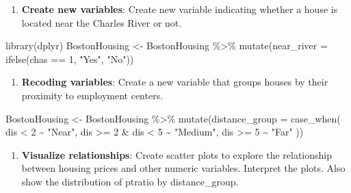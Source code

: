 \documentclass[
]{book}
\newenvironment{Shaded}{\begin{snugshade}}{\end{snugshade}}
\newcommand{\AttributeTok}[1]{\textcolor[rgb]{0.77,0.63,0.00}{#1}}
\newcommand{\DecValTok}[1]{\textcolor[rgb]{0.00,0.00,0.81}{#1}}
\newcommand{\FunctionTok}[1]{\textcolor[rgb]{0.00,0.00,0.00}{#1}}
\newcommand{\NormalTok}[1]{#1}
\newcommand{\OtherTok}[1]{\textcolor[rgb]{0.56,0.35,0.01}{#1}}
\newcommand{\SpecialCharTok}[1]{\textcolor[rgb]{0.00,0.00,0.00}{#1}}
\newcommand{\StringTok}[1]{\textcolor[rgb]{0.31,0.60,0.02}{#1}}
\providecommand{\tightlist}{%
  \setlength{\itemsep}{0pt}\setlength{\parskip}{0pt}}
\begin{document}
\begin{enumerate}
\def\labelenumi{\arabic{enumi}.}
\setcounter{enumi}{4}
\tightlist
\item
  \textbf{Create new variables}: Create new variable indicating whether a house is located near the Charles River or not.
\end{enumerate}

\begin{Shaded}
\begin{Highlighting}[]
\FunctionTok{library}\NormalTok{(dplyr)}
\NormalTok{BostonHousing }\OtherTok{\textless{}{-}}\NormalTok{ BostonHousing }\SpecialCharTok{\%\textgreater{}\%}
  \FunctionTok{mutate}\NormalTok{(}\AttributeTok{near\_river =} \FunctionTok{ifelse}\NormalTok{(chas }\SpecialCharTok{==} \DecValTok{1}\NormalTok{, }\StringTok{"Yes"}\NormalTok{, }\StringTok{"No"}\NormalTok{))}
\end{Highlighting}
\end{Shaded}

\begin{enumerate}
\def\labelenumi{\arabic{enumi}.}
\setcounter{enumi}{5}
\tightlist
\item
  \textbf{Recoding variables}: Create a new variable that groups houses by their proximity to employment centers.
\end{enumerate}

\begin{Shaded}
\begin{Highlighting}[]
\NormalTok{BostonHousing }\OtherTok{\textless{}{-}}\NormalTok{ BostonHousing }\SpecialCharTok{\%\textgreater{}\%}
  \FunctionTok{mutate}\NormalTok{(}\AttributeTok{distance\_group =} \FunctionTok{case\_when}\NormalTok{(}
\NormalTok{    dis }\SpecialCharTok{\textless{}} \DecValTok{2} \SpecialCharTok{\textasciitilde{}} \StringTok{"Near"}\NormalTok{,}
\NormalTok{    dis }\SpecialCharTok{\textgreater{}=} \DecValTok{2} \SpecialCharTok{\&}\NormalTok{ dis }\SpecialCharTok{\textless{}} \DecValTok{5} \SpecialCharTok{\textasciitilde{}} \StringTok{"Medium"}\NormalTok{,}
\NormalTok{    dis }\SpecialCharTok{\textgreater{}=} \DecValTok{5} \SpecialCharTok{\textasciitilde{}} \StringTok{"Far"}
\NormalTok{  ))}
\end{Highlighting}
\end{Shaded}

\begin{enumerate}
\def\labelenumi{\arabic{enumi}.}
\setcounter{enumi}{6}
\tightlist
\item
  \textbf{Visualize relationships}: Create scatter plots to explore the relationship between housing prices and other numeric variables. Interpret the plots. Also show the distribution of ptratio by distance\_group.
\end{enumerate}
\end{document}
